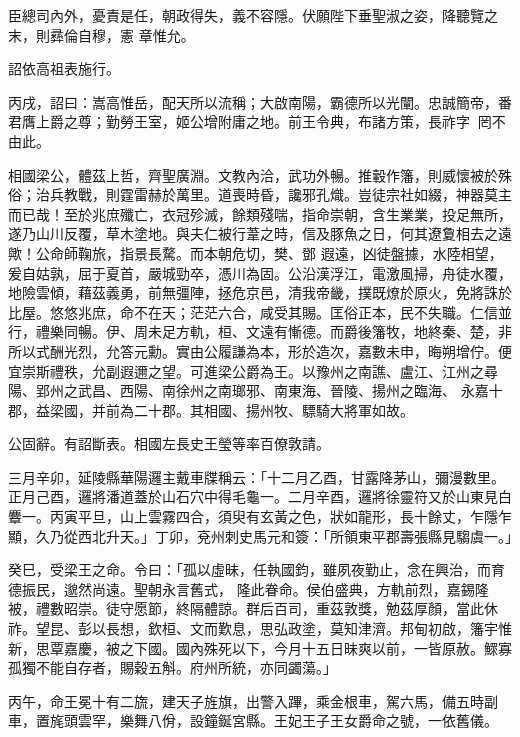 \begin{pinyinscope}
 臣總司內外，憂責是任，朝政得失，義不容隱。伏願陛下垂聖淑之姿，降聽覽之末，則彞倫自穆，憲
 章惟允。



 詔依高祖表施行。



 丙戌，詔曰：嵩高惟岳，配天所以流稱；大啟南陽，霸德所以光闡。忠誠簡帝，番君膺上爵之尊；勤勞王室，姬公增附庸之地。前王令典，布諸方策，長祚字，罔不由此。



 相國梁公，體茲上哲，齊聖廣淵。文教內洽，武功外暢。推轂作籓，則威懷被於殊俗；治兵教戰，則霆雷赫於萬里。道喪時昏，讒邪孔熾。豈徒宗社如綴，神器莫主而已哉！至於兆庶殲亡，衣冠殄滅，餘類殘喘，指命崇朝，含生業業，投足無所，遂乃山川反覆，草木塗地。與夫仁被行葦之時，信及豚魚之日，何其遼夐相去之遠歟！公命師鞠旅，指景長騖。而本朝危切，樊、鄧
 遐遠，凶徒盤據，水陸相望，爰自姑孰，屈于夏首，嚴城勁卒，憑川為固。公沿漢浮江，電激風掃，舟徒水覆，地險雲傾，藉茲義勇，前無彊陣，拯危京邑，清我帝畿，撲既燎於原火，免將誅於比屋。悠悠兆庶，命不在天；茫茫六合，咸受其賜。匡俗正本，民不失職。仁信並行，禮樂同暢。伊、周未足方軌，桓、文遠有慚德。而爵後籓牧，地終秦、楚，非所以式酬光烈，允答元勳。實由公履謙為本，形於造次，嘉數未申，晦朔增佇。便宜崇斯禮秩，允副遐邇之望。可進梁公爵為王。以豫州之南譙、盧江、江州之尋陽、郢州之武昌、西陽、南徐州之南瑯邪、南東海、晉陵、揚州之臨海、
 永嘉十郡，益梁國，并前為二十郡。其相國、揚州牧、驃騎大將軍如故。



 公固辭。有詔斷表。相國左長史王瑩等率百僚敦請。



 三月辛卯，延陵縣華陽邏主戴車牒稱云：「十二月乙酉，甘露降茅山，彌漫數里。正月己酉，邏將潘道蓋於山石穴中得毛龜一。二月辛酉，邏將徐靈符又於山東見白麞一。丙寅平旦，山上雲霧四合，須臾有玄黃之色，狀如龍形，長十餘丈，乍隱乍顯，久乃從西北升天。」丁卯，兗州刺史馬元和簽：「所領東平郡壽張縣見騶虞一。」



 癸巳，受梁王之命。令曰：「孤以虛昧，任執國鈞，雖夙夜勤止，念在興治，而育德振民，邈然尚遠。聖朝永言舊式，
 隆此眷命。侯伯盛典，方軌前烈，嘉錫隆被，禮數昭崇。徒守愿節，終隔體諒。群后百司，重茲敦獎，勉茲厚顏，當此休祚。望昆、彭以長想，欽桓、文而歎息，思弘政塗，莫知津濟。邦甸初啟，籓宇惟新，思覃嘉慶，被之下國。國內殊死以下，今月十五日昧爽以前，一皆原赦。鰥寡孤獨不能自存者，賜穀五斛。府州所統，亦同蠲蕩。」



 丙午，命王冕十有二旒，建天子旌旗，出警入蹕，乘金根車，駕六馬，備五時副車，置旄頭雲罕，樂舞八佾，設鐘鋋宮縣。王妃王子王女爵命之號，一依舊儀。




\end{pinyinscope}
